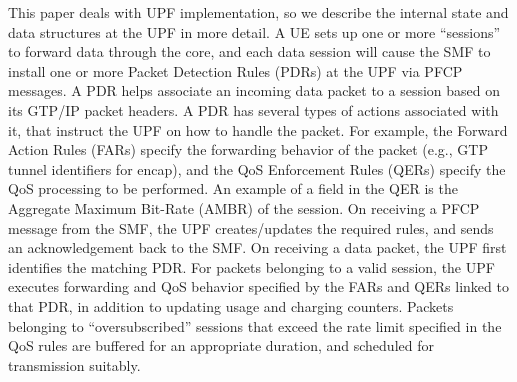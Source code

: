 This paper deals with UPF implementation, so we describe the internal state and data structures at the UPF in more detail. A UE sets up one or more ``sessions'' to forward data through the core, and each data session will cause the SMF to install one or more Packet Detection Rules (PDRs) at the UPF via PFCP messages. A PDR helps associate an incoming data packet to a session based on its GTP/IP packet headers. A PDR has several types of actions associated with it, that instruct the UPF on how to handle the packet. For example, the Forward Action Rules (FARs) specify the forwarding behavior of the packet (e.g., GTP tunnel identifiers for encap), and the QoS Enforcement Rules (QERs) specify the QoS processing to be performed. An example of a field in the QER is the  Aggregate Maximum Bit-Rate (AMBR) of the session. On receiving a PFCP message from the SMF, the UPF creates/updates the required rules, and sends an acknowledgement back to the SMF. On receiving a data packet, the UPF first identifies the matching PDR. For packets belonging to a valid session, the UPF executes forwarding and QoS behavior specified by the FARs and QERs linked to that PDR, in addition to updating usage and charging counters. Packets belonging to ``oversubscribed'' sessions that exceed the rate limit specified in the QoS rules are buffered for an appropriate duration, and scheduled for transmission suitably. 


%


